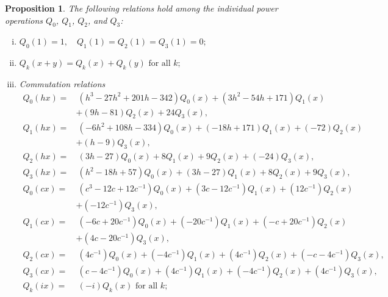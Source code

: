 \documentclass{gtpart}
\newtheorem{prop}[thm]{Proposition}
\theoremstyle{definition}
\theoremstyle{remark}
\begin{document}
\begin{prop}
\label{prop:Q}
 The following relations hold among the individual power operations 
 $Q_0$, $Q_1$, $Q_2$, and $Q_3$: 
 \begin{enumerate}[(i)]
  \item \label{Q(i)} $Q_0(1) = 1, \quad Q_1(1) = Q_2(1) = Q_3(1) = 0;$ 

  \item \label{Q(ii)} $Q_k(x+y) = Q_k(x) + Q_k(y) \text{~for all~} k;$ 

  \item \label{Q(iii)} {\em Commutation relations }
  \begin{equation*}
  \begin{split}
   Q_0(h x) = & ~ (h^3 - 27 h^2 + 201 h - 342) Q_0(x) + (3 h^2 - 54 h + 171) Q_1(x) \qquad \qquad \\
              & + (9 h - 81) Q_2(x) + 24 Q_3(x), \\
   Q_1(h x) = & ~ (-6 h^2 + 108 h - 334) Q_0(x) + (-18 h + 171) Q_1(x) + (-72) Q_2(x) \\
              & + (h - 9) Q_3(x), \\
   Q_2(h x) = & ~ (3 h - 27) Q_0(x) + 8 Q_1(x) + 9 Q_2(x) + (-24) Q_3(x), \\
   Q_3(h x) = & ~ (h^2 - 18 h + 57) Q_0(x) + (3 h - 27) Q_1(x) + 8 Q_2(x) + 9 Q_3(x), \\
   Q_0(c x) = & ~ (c^3 - 12 c + 12 c^{-1}) Q_0(x) + (3 c - 12 c^{-1}) Q_1(x) + (12 c^{-1}) Q_2(x) \\
              & + (-12 c^{-1}) Q_3(x), \\
   Q_1(c x) = & ~ (-6 c + 20 c^{-1}) Q_0(x) + (-20 c^{-1}) Q_1(x) + (- c + 20 c^{-1}) Q_2(x) \\
              & + (4 c - 20 c^{-1}) Q_3(x), \\
   Q_2(c x) = & ~ (4 c^{-1}) Q_0(x) + (-4 c^{-1}) Q_1(x) + (4 c^{-1}) Q_2(x) + (- c - 4 c^{-1}) Q_3(x), \\
   Q_3(c x) = & ~ (c - 4 c^{-1}) Q_0(x) + (4 c^{-1}) Q_1(x) + (-4 c^{-1}) Q_2(x) + (4 c^{-1}) Q_3(x), \\
   Q_k(i x) = & ~ (-i) Q_k(x) \text{~for all~} k; 
  \end{split}
  \end{equation*}


\end{enumerate}
\end{prop}
\end{document}
